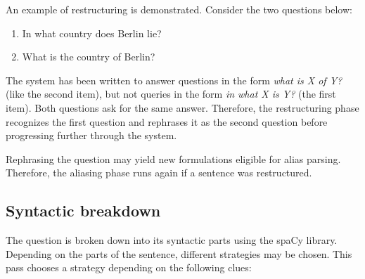 \documentclass{article}
\begin{document}
An example of restructuring is demonstrated. Consider the two questions below:

\begin{enumerate}
    \item In what country does Berlin lie?
    \item What is the country of Berlin?
\end{enumerate}

The system has been written to answer questions in the form \emph{what is X of Y?} (like the second item), but not queries in the form \emph{in what X is Y?} (the first item). Both questions ask for the same answer. Therefore, the restructuring phase recognizes the first question and rephrases it as the second question before progressing further through the system.

Rephrasing the question may yield new formulations eligible for alias parsing. Therefore, the aliasing phase runs again if a sentence was restructured.

\subsection{Syntactic breakdown}
The question is broken down into its syntactic parts using the spaCy library. Depending on the parts of the sentence, different strategies may be chosen. This pass chooses a strategy depending on the following clues:
\end{document}
